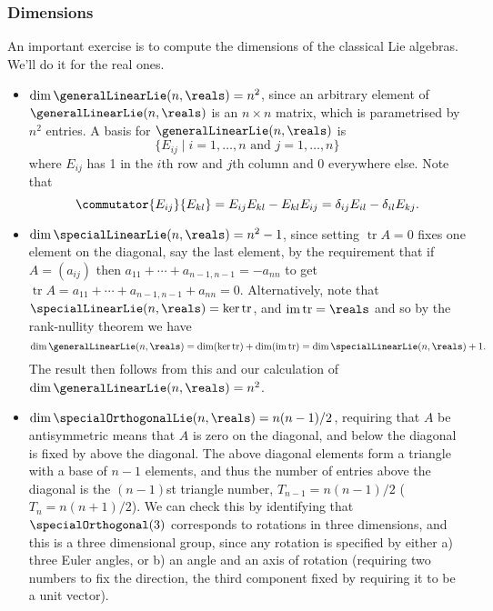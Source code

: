 \documentclass[fleqn]{NotesClass}
\DeclareMathOperator{\tr}{tr}
\DeclareMathOperator{\im}{im}
\begin{document}
    \subsubsection{Dimensions}
    An important exercise is to compute the dimensions of the classical Lie algebras.
    We'll do it for the real ones.
    \begin{itemize}
        \item \(\dim \generalLinearLie(n, \reals) = n^2\), since an arbitrary element of \(\generalLinearLie(n, \reals)\) is an \(n \times n\) matrix, which is parametrised by \(n^2\) entries.
        A basis for \(\generalLinearLie(n, \reals)\) is
        \begin{equation}
            \{E_{ij} \mid i = 1, \dotsc, n \text{ and } j = 1, \dotsc, n\}
        \end{equation}
        where \(E_{ij}\) has 1 in the \(i\)th row and \(j\)th column and \(0\) everywhere else.
        Note that
        \begin{equation}
            \commutator{E_{ij}}{E_{kl}} = E_{ij}E_{kl} - E_{kl}E_{ij} = \delta_{ij}E_{il} - \delta_{il}E_{kj}.
        \end{equation}
        \item \(\dim \specialLinearLie(n, \reals) = n^2 - 1\), since setting \(\tr A = 0\) fixes one element on the diagonal, say the last element, by the requirement that if \(A = (a_{ij})\) then \(a_{11} + \dotsb + a_{n-1,n-1} = -a_{nn}\) to get \(\tr A = a_{11} + \dotsb + a_{n-1,n-1} + a_{nn} = 0\).
        Alternatively, note that \(\specialLinearLie(n, \reals) = \ker \tr\), and \(\im \tr = \reals\) and so by the rank-nullity theorem we have
        \begin{equation}
            \dim \generalLinearLie(n, \reals) = \dim(\ker \tr) + \dim(\im \tr) = \dim \specialLinearLie(n, \reals) + 1.
        \end{equation}
        The result then follows from this and our calculation of \(\dim \generalLinearLie(n, \reals) = n^2\).
        \item \(\dim \specialOrthogonalLie(n, \reals) = n(n - 1)/2\), requiring that \(A\) be antisymmetric means that \(A\) is zero on the diagonal, and below the diagonal is fixed by above the diagonal.
        The above diagonal elements form a triangle with a base of \(n - 1\) elements, and thus the number of entries above the diagonal is the \((n-1)\)st triangle number, \(T_{n-1} = n(n-1)/2\) (\(T_n = n(n + 1)/2\)).
        We can check this by identifying that \(\specialOrthogonal(3)\) corresponds to rotations in three dimensions, and this is a three dimensional group, since any rotation is specified by either a) three Euler angles, or b) an angle and an axis of rotation (requiring two numbers to fix the direction, the third component fixed by requiring it to be a unit vector).

\end{itemize}
\end{document}
